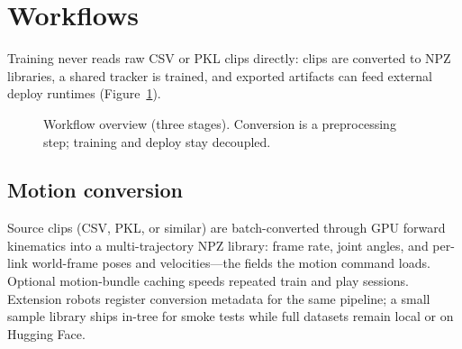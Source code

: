 \documentclass[11pt,a4paper]{article}
\begin{document}
\FloatBarrier
\section{Workflows}
\label{sec:workflows}

Training never reads raw CSV or PKL clips directly: clips are converted to
NPZ libraries, a shared tracker is trained, and exported artifacts can feed
external deploy runtimes (Figure~\ref{fig:pipeline}).

\begin{figure}[htbp]
  \centering
  \vspace{0.4em}
  \caption{Workflow overview (three stages). Conversion is a preprocessing step;
  training and deploy stay decoupled.}
  \label{fig:pipeline}
\end{figure}

\subsection{Motion conversion}
Source clips (CSV, PKL, or similar) are batch-converted through GPU forward
kinematics into a multi-trajectory NPZ library: frame rate, joint angles, and
per-link world-frame poses and velocities---the fields the motion command loads.
Optional motion-bundle caching speeds repeated train and play sessions.
Extension robots register conversion metadata for the same pipeline; a small
sample library ships in-tree for smoke tests while full datasets remain local
or on Hugging Face.
\end{document}
